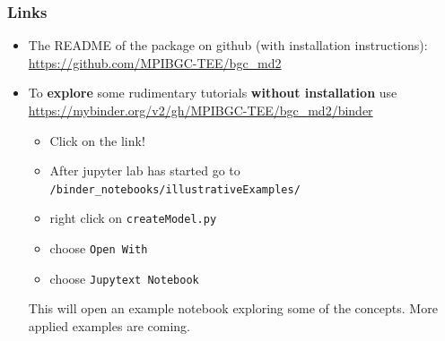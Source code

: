\documentclass[unknownkeysallowed,usepdftitle=false]{beamer}
\newcommand{\secvariable}{nothing}
\newcommand{\mysection}[1]{\renewcommand{\secvariable}{#1}
}
\begin{document}
\mysection{Links}\label{links}
\begin{frame}
	\frametitle{Links}
  \begin{itemize}
    \item
      The README of the package on github (with installation instructions):
      \url{https://github.com/MPIBGC-TEE/bgc_md2}
    \item
      To {\bf explore} some rudimentary tutorials {\bf without installation} use
      \url{https://mybinder.org/v2/gh/MPIBGC-TEE/bgc_md2/binder}
      \begin{itemize}
        \item Click on the link! 
        \item After jupyter lab has started  
        go to \texttt{/binder\_notebooks/illustrativeExamples/} 
      \item right click on \texttt{createModel.py} 
      \item choose \texttt{Open With} 
      \item choose \texttt{Jupytext Notebook} 
      \end{itemize}
      This will open an example notebook exploring some of the concepts.
      More applied examples are coming.

      
  \end{itemize}
\end{frame}
\end{document}
